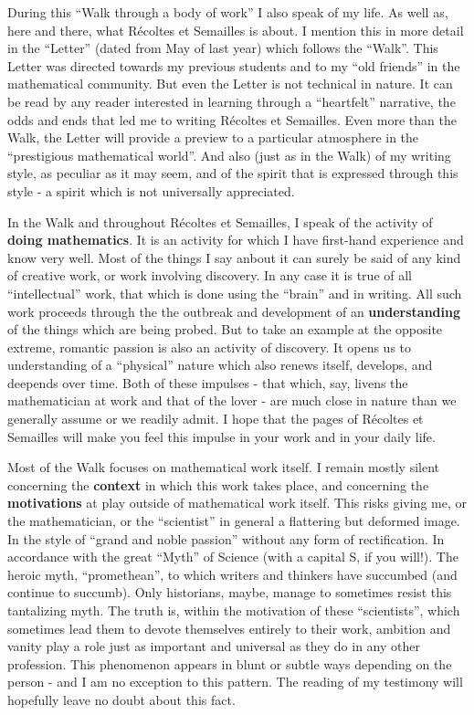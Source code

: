 During this ``Walk through a body of work'' 
I also speak of my life.
As well as, here and there, what 
R\'ecoltes et Semailles 
is about.
I mention this in more detail in the ``Letter'' 
(dated from May of last year) which
follows the ``Walk''. 
This Letter was directed towards my
previous students and to my ``old friends'' in the mathematical community. 
But even the Letter is not technical in nature. 
It can be read by any 
reader interested in learning 
through a ``heartfelt'' narrative, the odds and ends that led me to writing 
R\'ecoltes et Semailles. Even more than the Walk, the Letter will provide a 
preview to a particular atmosphere in the ``prestigious mathematical world''.
And also (just as in the Walk) of my writing style, as peculiar as it may seem, and of the
spirit that is expressed through this style - a spirit which is not universally
appreciated. 

In the Walk and throughout R\'ecoltes et Semailles, I speak of the activity of 
\textbf{doing mathematics}.
It is an activity for which I have first-hand experience and know very well. Most of the
things I say anbout it can surely be said of any kind of creative work, or work involving
discovery. 
In any case it is true of all ``intellectual''
work, that which is done using the ``brain'' and in writing. 
All such work proceeds through the the outbreak and development of an
\textbf{understanding} of the things which are being probed. 
But to take an example at the 
opposite extreme, romantic passion is also an activity of discovery. 
It opens us to understanding of a ``physical'' nature which also renews itself, develops, and
deepends over time. 
Both of these impulses - 
that which, say, livens the mathematician at work and
that of the lover 
- are much close in nature than we generally assume or we readily admit. 
I hope that the pages of 
R\'ecoltes et Semailles 
will make you feel this impulse in your work and in your daily life. 

Most of the Walk focuses on mathematical work itself. 
I remain mostly silent concerning the \textbf{context} in which this work takes place, and
concerning the \textbf{motivations} at play outside of mathematical work itself. 
This risks giving me, or the mathematician, or the ``scientist'' in general 
a flattering but deformed image. 
In the style of ``grand and noble passion'' without any form of rectification.
In accordance with the great ``Myth'' of Science 
(with a capital S, if you will!).
The heroic myth, ``promethean'', to which writers and thinkers have succumbed 
(and continue to succumb). 
Only historians, maybe, manage to sometimes resist this tantalizing myth. 
The truth is, within the motivation of these ``scientists'',
which sometimes lead them to devote themselves entirely to their work, ambition and vanity
play a role just as important and universal as they do in any other profession. 
This phenomenon 
appears in
blunt or subtle ways depending on the person - and I am no exception to this pattern.
The reading of my testimony will hopefully leave no doubt about this fact. 

